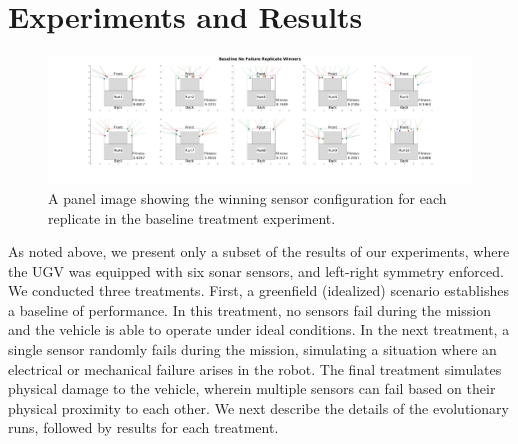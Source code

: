 \section{Experiments and Results}
\label{s:results}



\begin{figure}[!htb]
\includegraphics[width=1.0\textwidth]{Figures/6_sonar_symmetric_placement_without_failure_winners_panel_2x5.png}
     \vspace{-0.5in}
    \caption{A panel image showing the winning sensor configuration for each replicate in the baseline treatment experiment.}
    \label{baseline_panel_fig}
    \vspace{-0.05in}
\end{figure}

As noted above, we present only a subset of the results of our experiments, where the
UGV was equipped with six sonar sensors, and left-right symmetry enforced.
We conducted three treatments.
%
First, a greenfield (idealized) scenario establishes a baseline of performance.  
%
%
In this treatment, no sensors fail during the mission and the vehicle
is able to operate under ideal conditions.  
In the next treatment, a single sensor randomly fails during the mission,
simulating a situation where an electrical or mechanical failure arises in the robot.  
%
The final treatment simulates physical damage to the vehicle,
wherein multiple sensors can fail based on their physical proximity to each other.  
We next describe the details of the evolutionary runs, followed by results for each treatment.

